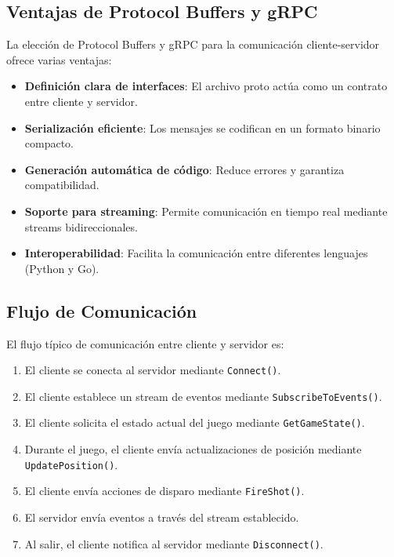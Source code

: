 \documentclass[11pt,letterpaper]{article}
\begin{document}
\subsection{Ventajas de Protocol Buffers y gRPC}

La elección de Protocol Buffers y gRPC para la comunicación cliente-servidor ofrece varias ventajas:

\begin{itemize}
    \item \textbf{Definición clara de interfaces}: El archivo proto actúa como un contrato entre cliente y servidor.
    \item \textbf{Serialización eficiente}: Los mensajes se codifican en un formato binario compacto.
    \item \textbf{Generación automática de código}: Reduce errores y garantiza compatibilidad.
    \item \textbf{Soporte para streaming}: Permite comunicación en tiempo real mediante streams bidireccionales.
    \item \textbf{Interoperabilidad}: Facilita la comunicación entre diferentes lenguajes (Python y Go).
\end{itemize}

\subsection{Flujo de Comunicación}

El flujo típico de comunicación entre cliente y servidor es:

\begin{enumerate}
    \item El cliente se conecta al servidor mediante \texttt{Connect()}.
    \item El cliente establece un stream de eventos mediante \texttt{SubscribeToEvents()}.
    \item El cliente solicita el estado actual del juego mediante \texttt{GetGameState()}.
    \item Durante el juego, el cliente envía actualizaciones de posición mediante \texttt{UpdatePosition()}.
    \item El cliente envía acciones de disparo mediante \texttt{FireShot()}.
    \item El servidor envía eventos a través del stream establecido.
    \item Al salir, el cliente notifica al servidor mediante \texttt{Disconnect()}.
\end{enumerate}
\end{document}
